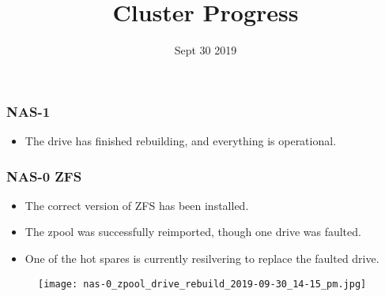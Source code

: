\documentclass{beamer}
\title{Cluster Progress}
\date{Sept 30 2019}
\begin{document}

\begin{frame}
  \maketitle
\end{frame}



\begin{frame}
  \frametitle{NAS-1}

  \begin{itemize}
  \item The drive has finished rebuilding, and everything is operational.
  \end{itemize}

\end{frame}

\begin{frame}
  \frametitle{NAS-0 ZFS}

  \begin{itemize}
  \item The correct version of ZFS has been installed.

  \item The zpool was successfully reimported, though one drive was faulted.

  \item One of the hot spares is currently resilvering to replace the faulted drive.
  \end{itemize}

  \begin{figure}[H]
    \begin{center}
      \texttt{[image: nas-0\_zpool\_drive\_rebuild\_2019-09-30\_14-15\_pm.jpg]}
    \end{center}
      \end{figure}

\end{frame}
\end{document}

